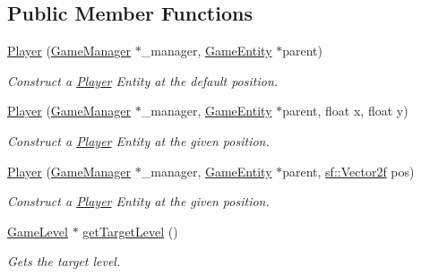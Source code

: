 \subsection*{Public Member Functions}
\begin{DoxyCompactItemize}
\item 
\mbox{\hyperlink{class_player_a1f51378f8330bc3f145f951dfdd9cabd}{Player}} (\mbox{\hyperlink{class_game_manager}{Game\+Manager}} $\ast$\+\_\+manager, \mbox{\hyperlink{class_game_entity}{Game\+Entity}} $\ast$parent)
\begin{DoxyCompactList}\small\item\em Construct a \mbox{\hyperlink{class_player}{Player}} Entity at the default position. \end{DoxyCompactList}\item 
\mbox{\hyperlink{class_player_ad4699524916b2621f062c30701eb7a32}{Player}} (\mbox{\hyperlink{class_game_manager}{Game\+Manager}} $\ast$\+\_\+manager, \mbox{\hyperlink{class_game_entity}{Game\+Entity}} $\ast$parent, float x, float y)
\begin{DoxyCompactList}\small\item\em Construct a \mbox{\hyperlink{class_player}{Player}} Entity at the given position. \end{DoxyCompactList}\item 
\mbox{\hyperlink{class_player_a3efcb969a2456cf7814fc50be53489a6}{Player}} (\mbox{\hyperlink{class_game_manager}{Game\+Manager}} $\ast$\+\_\+manager, \mbox{\hyperlink{class_game_entity}{Game\+Entity}} $\ast$parent, \mbox{\hyperlink{classsf_1_1_vector2}{sf\+::\+Vector2f}} pos)
\begin{DoxyCompactList}\small\item\em Construct a \mbox{\hyperlink{class_player}{Player}} Entity at the given position. \end{DoxyCompactList}\item 
\mbox{\label{class_player_ae9b8aad85d02c0dd9973bb02ba36b5c5}} 
\mbox{\hyperlink{class_game_level}{Game\+Level}} $\ast$ \mbox{\hyperlink{class_player_ae9b8aad85d02c0dd9973bb02ba36b5c5}{get\+Target\+Level}} ()
\begin{DoxyCompactList}\small\item\em Gets the target level. \end{DoxyCompactList}\item 
\mbox{\label{class_player_a1741bd5781fda587c31ec63851ecf41d}} 

\end{DoxyCompactItemize}
